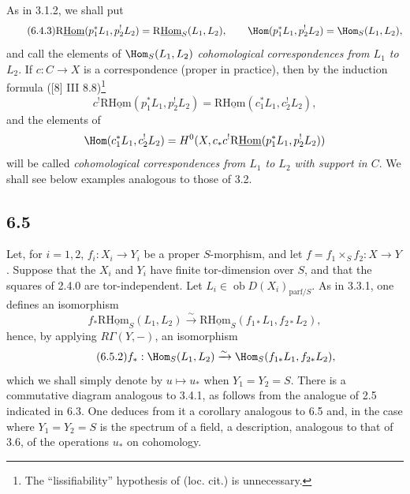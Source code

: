 As in 3.1.2, we shall put
\begin{equation}
\tag{6.4.3}
\mathrm{R}\underline{\mathrm{Hom}}(p_1^*L_1,p_2^!L_2)=\mathrm{R}\underline{\mathrm{Hom}}_S(L_1,L_2),\qquad
\Hom(p_1^*L_1,p_2^!L_2)=\Hom_S(L_1,L_2),
\end{equation}
and call the elements of $\Hom_S(L_1,L_2)$ \emph{cohomological correspondences from $L_1$ to $L_2$}. If $c:C\to X$ is a correspondence (proper in practice), then by the induction formula ([8] III 8.8)\footnote{The ``lissifiability'' hypothesis of (loc. cit.) is unnecessary.}
\begin{equation}
\tag{6.4.4}
c^!\mathrm{R}\underline{\mathrm{Hom}}(p_1^*L_1,p_2^!L_2)=\mathrm{R}\underline{\mathrm{Hom}}(c_1^*L_1,c_2^!L_2),
\end{equation}
and the elements of
\[
\Hom(c_1^*L_1,c_2^!L_2)=H^0(X,c_*c^!\mathrm{R}\underline{\mathrm{Hom}}(p_1^*L_1,p_2^!L_2))
\]
will be called \emph{cohomological correspondences from $L_1$ to $L_2$ with support in $C$}. We shall see below examples analogous to those of 3.2.

\subsection*{6.5}
Let, for $i=1,2$, $f_i:X_i\to Y_i$ be a proper $S$-morphism, and let $f=f_1\times_Sf_2:X\to Y$. Suppose that the $X_i$ and $Y_i$ have finite tor-dimension over $S$, and that the squares of 2.4.0 are tor-independent. Let $L_i\in\operatorname{ob}D(X_i)_{\mathrm{parf}/S}$. As in 3.3.1, one defines an isomorphism
\begin{equation}
\tag{6.5.1}
f_*\mathrm{R}\underline{\mathrm{Hom}}_S(L_1,L_2)\xrightarrow{\sim}\mathrm{R}\underline{\mathrm{Hom}}_S(f_{1*}L_1,f_{2*}L_2),
\end{equation}
hence, by applying $R\Gamma(Y,-)$, an isomorphism
\begin{equation}
\tag{6.5.2}
f_*:\Hom_S(L_1,L_2)\xrightarrow{\sim}\Hom_S(f_{1*}L_1,f_{2*}L_2),
\end{equation}
which we shall simply denote by $u\mapsto u_*$ when $Y_1=Y_2=S$. There is a commutative diagram analogous to 3.4.1, as follows from the analogue of 2.5 indicated in 6.3. One deduces from it a corollary analogous to 6.5 and, in the case where $Y_1=Y_2=S$ is the spectrum of a field, a description, analogous to that of 3.6, of the operations $u_*$ on cohomology.

